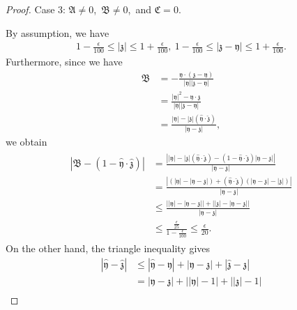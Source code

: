 \documentclass[10pt,a4paper]{amsart}
\numberwithin{equation}{section}
\begin{document}
\begin{proof}
Case 3: $\mathfrak{A}\neq 0$,\ $\mathfrak{B}\neq 0$,\ and $\mathfrak{C}=0$.

By assumption, we have
\begin{align}\label{Case3assu}
1-\frac{\epsilon}{100}\leq |\mathfrak{z}|\leq 1+\frac{\epsilon}{100},\ 1-\frac{\epsilon}{100}\leq |\mathfrak{z}-\mathfrak{y}|\leq 1+\frac{\epsilon}{100}.
\end{align}
Furthermore, since we have
\begin{align*}
\mathfrak{B}
&=
-\frac{\mathfrak{y}\cdot(\mathfrak{z}-\mathfrak{y})}
{|\mathfrak{y}||\mathfrak{z}-\mathfrak{y}|}
\\
&=
\frac{|\mathfrak{y}|^2-\mathfrak{y}\cdot\mathfrak{z}}
{|\mathfrak{y}||\mathfrak{z}-\mathfrak{y}|}
\\
&=
\frac{|\mathfrak{y}|
-|\mathfrak{z}|
\left(\hat{\mathfrak{y}}\cdot\hat{\mathfrak{z}}\right)}
{|\mathfrak{y}-\mathfrak{z}|},
\end{align*}
we obtain
\begin{align}\label{Case3es1}
\begin{aligned}
\left|
\mathfrak{B}
-\left(1-\hat{\mathfrak{y}}\cdot\hat{\mathfrak{z}}\right)
\right|
&=
\frac{
\left|
|\mathfrak{y}|
-|\mathfrak{z}|
\left(\hat{\mathfrak{y}}\cdot\hat{\mathfrak{z}}\right)
-\left(1-\hat{\mathfrak{y}}\cdot\hat{\mathfrak{z}}\right)
|\mathfrak{y}-\mathfrak{z}|
\right|
}
{|\mathfrak{y}-\mathfrak{z}|}
\\
&=
\frac{
\left|
\left(|\mathfrak{y}|-|\mathfrak{y}-\mathfrak{z}|\right)
+
\left(\hat{\mathfrak{y}}\cdot\hat{\mathfrak{z}}\right)
\left(|\mathfrak{y}-\mathfrak{z}|-|\mathfrak{z}|\right)
\right|
}
{|\mathfrak{y}-\mathfrak{z}|}
\\
&\leq
\frac{
\left||\mathfrak{y}|-|\mathfrak{y}-\mathfrak{z}|\right|
+
\left||\mathfrak{z}|-|\mathfrak{y}-\mathfrak{z}|\right|
}
{|\mathfrak{y}-\mathfrak{z}|}
\\
&\leq
\frac{\frac{\epsilon}{25}}
{1-\frac{\epsilon}{100}}
\leq
\frac{\epsilon}{20}.
\end{aligned}
\end{align}
On the other hand, the triangle inequality gives
\begin{align*}
\left|\hat{\mathfrak{y}}-\hat{\mathfrak{z}}\right|
&\leq
\left|\hat{\mathfrak{y}}-\mathfrak{y}\right|
+
\left|\mathfrak{y}-\mathfrak{z}\right|
+
\left|\hat{\mathfrak{z}}-\mathfrak{z}\right|
\\
&=
|\mathfrak{y}-\mathfrak{z}|
+
\left||\mathfrak{y}|-1\right|
+
\left||\mathfrak{z}|-1\right|
\\

\end{align*}
\end{proof}
\end{document}
